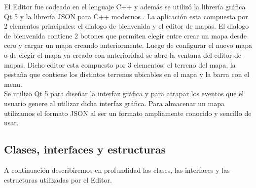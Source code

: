 \documentclass[titlepage,a4paper,12pt]{article}
\begin{document}
El Editor fue codeado en el lenguaje C++ y además se utilizó la librería gráfica Qt 5 y la librería JSON para C++ modernos . La aplicación esta compuesta por 2 elementos principales: el dialogo de bienvenida y el editor de mapas. El dialogo de bienvenida contiene 2 botones que permiten elegir entre crear un mapa desde cero y cargar un mapa creando anteriormente. Luego de configurar el nuevo mapa o de elegir el mapa ya creado con anterioridad se abre la ventana del editor de mapas. Dicho editor esta compuesto por 3 elementos: el terreno del mapa, la pestaña que contiene los distintos terrenos ubicables en el mapa y la barra con el menu.\\

Se utilizo Qt 5 para diseñar la interfaz gráfica y para atrapar los eventos que el usuario genere al utilizar dicha interfaz gráfica. Para almacenar un mapa utilizamos el formato JSON al ser un formato ampliamente conocido y sencillo de usar.

\subsection{Clases, interfaces y estructuras}

A continuación describiremos en profundidad las clases, las interfaces y las estructuras utilizadas por el Editor.
\end{document}
